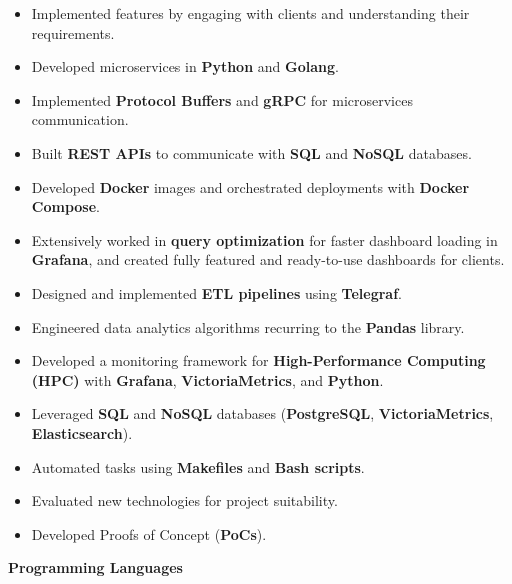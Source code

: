 \documentclass[10pt,a4paper,ragged2e,withhyper]{altacv}
\begin{document}
\begin{paracol}{2}
      \begin{itemize}
            \item Implemented features by engaging with clients and understanding their
                  requirements.
            \item Developed microservices in \textbf{Python} and \textbf{Golang}.
            \item Implemented \textbf{Protocol Buffers} and \textbf{gRPC} for microservices
                  communication.
            \item Built \textbf{REST APIs} to communicate with \textbf{SQL} and \textbf{NoSQL}
                  databases.
            \item Developed \textbf{Docker} images and orchestrated deployments with
                  \textbf{Docker Compose}.
            \item Extensively worked in \textbf{query optimization} for faster dashboard loading
                  in \textbf{Grafana}, and created fully featured and ready-to-use dashboards for
                  clients.
            \item Designed and implemented \textbf{ETL pipelines} using \textbf{Telegraf}.
            \item Engineered data analytics algorithms recurring to the \textbf{Pandas} library.
            \item Developed a monitoring framework for \textbf{High-Performance Computing (HPC)}
                  with \textbf{Grafana}, \textbf{VictoriaMetrics}, and \textbf{Python}.
            \item Leveraged \textbf{SQL} and \textbf{NoSQL} databases (\textbf{PostgreSQL},
                  \textbf{VictoriaMetrics}, \textbf{Elasticsearch}).
            \item Automated tasks using \textbf{Makefiles} and \textbf{Bash scripts}.
            \item Evaluated new technologies for project suitability.
            \item Developed Proofs of Concept (\textbf{PoCs}).
      \end{itemize}

      \switchcolumn


      \textbf{Programming Languages}
      \newline \medbreak
      \newline \medbreak


\end{paracol}
\end{document}
